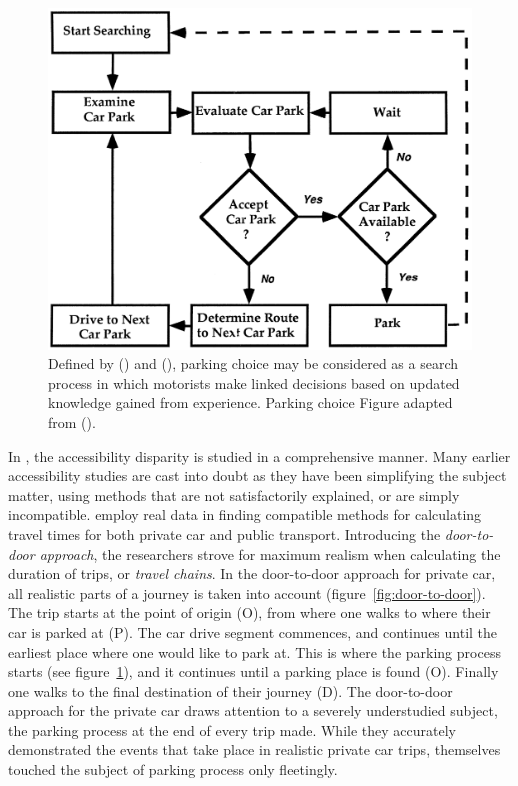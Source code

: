 \begin{figure}[H]%
    \centering
    \includegraphics[width=.75\textwidth]{images/thesis_parking_search_process_thompson1998.PNG}
    \caption[Parking search process]{Defined by \citeauthor{Layzell1985} (\citeyear{Layzell1985}) and \citeauthor{Polak1989} (\citeyear{Polak1989}), parking choice may be considered as a search process in which motorists make linked decisions based on updated knowledge gained from experience. Parking choice Figure adapted from \citeauthor{Thompson1998} (\citeyear{Thompson1998}).}%
    \label{fig:parking-process-thompson}%
\end{figure}

In , the accessibility disparity is studied in a comprehensive manner. Many earlier accessibility studies are cast into doubt as they have been simplifying the subject matter, using methods that are not satisfactorily explained, or are simply incompatible. \citeauthor{Salonen2013} employ real data in finding compatible methods for calculating travel times for both private car and public transport. Introducing the \textit{door-to-door approach}, the researchers strove for maximum realism when calculating the duration of trips, or \textit{travel chains}. In the door-to-door approach for private car, all realistic parts of a journey is taken into account (figure~\ref{fig:door-to-door}). The trip starts at the point of origin (O), from where one walks to where their car is parked at (P). The car drive segment commences, and continues until the earliest place where one would like to park at. This is where the parking process starts (see figure~\ref{fig:parking-process-thompson}), and it continues until a parking place is found (O). Finally one walks to the final destination of their journey (D). The door-to-door approach for the private car draws attention to a severely understudied subject, the parking process at the end of every trip made. While they accurately demonstrated the events that take place in realistic private car trips, \citeauthor{Salonen2013} themselves touched the subject of parking process only fleetingly.

